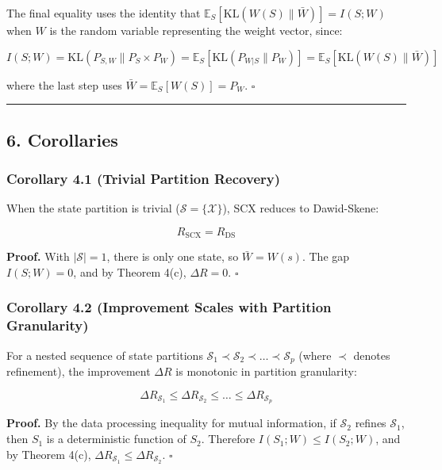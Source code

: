\documentclass[
  12pt,
]{ctexart}
\begin{document}
The final equality uses the identity that
\(\mathbb{E}_S[\text{KL}(W(S) \parallel \bar{W})] = I(S; W)\) when \(W\)
is the random variable representing the weight vector, since:

\[I(S; W) = \text{KL}(P_{S,W} \parallel P_S \times P_W) = \mathbb{E}_S[\text{KL}(P_{W|S} \parallel P_W)] = \mathbb{E}_S[\text{KL}(W(S) \parallel \bar{W})]\]

where the last step uses \(\bar{W} = \mathbb{E}_S[W(S)] = P_W\).
\(\square\)

\begin{center}\rule{0.5\linewidth}{0.5pt}\end{center}

\subsection{6. Corollaries}\label{corollaries}

\subsubsection{Corollary 4.1 (Trivial Partition
Recovery)}\label{corollary-4.1-trivial-partition-recovery}

When the state partition is trivial (\(\mathcal{S} = \{\mathcal{X}\}\)),
SCX reduces to Dawid-Skene:

\[R_{\text{SCX}} = R_{\text{DS}}\]

\textbf{Proof.} With \(|\mathcal{S}| = 1\), there is only one state, so
\(\bar{W} = W(s)\). The gap \(I(S; W) = 0\), and by Theorem 4(c),
\(\Delta R = 0\). \(\square\)

\subsubsection{Corollary 4.2 (Improvement Scales with Partition
Granularity)}\label{corollary-4.2-improvement-scales-with-partition-granularity}

For a nested sequence of state partitions
\(\mathcal{S}_1 \prec \mathcal{S}_2 \prec \dots \prec \mathcal{S}_p\)
(where \(\prec\) denotes refinement), the improvement \(\Delta R\) is
monotonic in partition granularity:

\[\Delta R_{\mathcal{S}_1} \leq \Delta R_{\mathcal{S}_2} \leq \dots \leq \Delta R_{\mathcal{S}_p}\]

\textbf{Proof.} By the data processing inequality for mutual
information, if \(\mathcal{S}_2\) refines \(\mathcal{S}_1\), then
\(S_1\) is a deterministic function of \(S_2\). Therefore
\(I(S_1; W) \leq I(S_2; W)\), and by Theorem 4(c),
\(\Delta R_{\mathcal{S}_1} \leq \Delta R_{\mathcal{S}_2}\). \(\square\)
\end{document}
